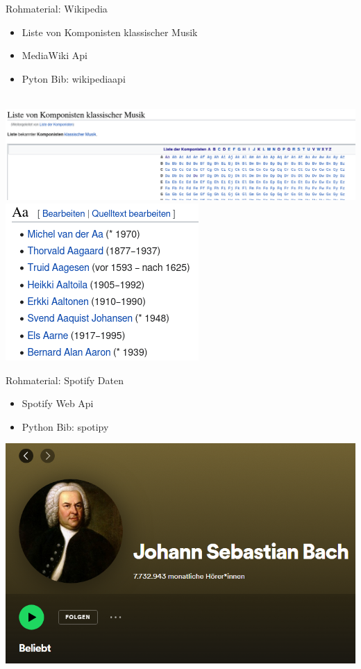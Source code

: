 \documentclass{beamer}
\begin{document}
\begin{frame}{Rohmaterial: Wikipedia}
	\begin{itemize}
		\item \glqq Liste von Komponisten klassischer Musik\grqq
		\item MediaWiki Api
		\item Pyton Bib: wikipediaapi
	\end{itemize}
~\\
	\includegraphics[scale=.21]{"data/wikiKomponistenListe.png"}
	\includegraphics[scale=.3]{"data/wikiKomponistenA.png"}
\end{frame}
\begin{frame}{Rohmaterial: Spotify Daten}
	\begin{itemize}
		\item Spotify Web Api
		\item Python Bib: spotipy
	\end{itemize}
	\includegraphics[scale=.4]{"data/spotifyscreenshot.png"}
\end{frame}
\end{document}
